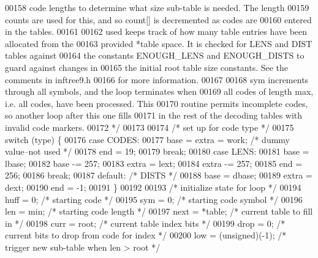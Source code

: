 \begin{DoxyCode}
00158 \textcolor{comment}{       code lengths to determine what size sub-table is needed.  The length}
00159 \textcolor{comment}{       counts are used for this, and so count[] is decremented as codes are}
00160 \textcolor{comment}{       entered in the tables.}
00161 \textcolor{comment}{}
00162 \textcolor{comment}{       used keeps track of how many table entries have been allocated from the}
00163 \textcolor{comment}{       provided *table space.  It is checked for LENS and DIST tables against}
00164 \textcolor{comment}{       the constants ENOUGH\_LENS and ENOUGH\_DISTS to guard against changes in}
00165 \textcolor{comment}{       the initial root table size constants.  See the comments in inftree9.h}
00166 \textcolor{comment}{       for more information.}
00167 \textcolor{comment}{}
00168 \textcolor{comment}{       sym increments through all symbols, and the loop terminates when}
00169 \textcolor{comment}{       all codes of length max, i.e. all codes, have been processed.  This}
00170 \textcolor{comment}{       routine permits incomplete codes, so another loop after this one fills}
00171 \textcolor{comment}{       in the rest of the decoding tables with invalid code markers.}
00172 \textcolor{comment}{     */}
00173 
00174     \textcolor{comment}{/* set up for code type */}
00175     \textcolor{keywordflow}{switch} (type) \{
00176     \textcolor{keywordflow}{case} CODES:
00177         base = extra = work;    \textcolor{comment}{/* dummy value--not used */}
00178         end = 19;
00179         \textcolor{keywordflow}{break};
00180     \textcolor{keywordflow}{case} LENS:
00181         base = lbase;
00182         base -= 257;
00183         extra = lext;
00184         extra -= 257;
00185         end = 256;
00186         \textcolor{keywordflow}{break};
00187     \textcolor{keywordflow}{default}:            \textcolor{comment}{/* DISTS */}
00188         base = dbase;
00189         extra = dext;
00190         end = -1;
00191     \}
00192 
00193     \textcolor{comment}{/* initialize state for loop */}
00194     huff = 0;                   \textcolor{comment}{/* starting code */}
00195     sym = 0;                    \textcolor{comment}{/* starting code symbol */}
00196     len = min;                  \textcolor{comment}{/* starting code length */}
00197     next = *table;              \textcolor{comment}{/* current table to fill in */}
00198     curr = root;                \textcolor{comment}{/* current table index bits */}
00199     drop = 0;                   \textcolor{comment}{/* current bits to drop from code for index */}
00200     low = (unsigned)(-1);       \textcolor{comment}{/* trigger new sub-table when len > root */}

\end{DoxyCode}

